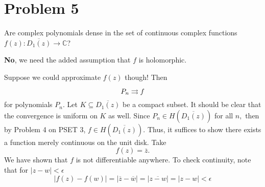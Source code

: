 \documentclass[11pt]{article}
\newcommand{\bbC}{\mathbb{C}}
\begin{document}
\section*{Problem 5}
\begin{problem}
    Are complex polynomials dense in the set of continuous complex functions $f(z): \overline{D_1(z)} \to \bbC$?
\end{problem}
\begin{solution}
\textbf{No}, we need the added assumption that $f$ is holomorphic. 

Suppose we could approximate $f(z)$ though! Then 
\[P_n\overset{}{\rightrightarrows} f\] for polynomials $P_n.$ Let $K \subseteq \overline{D_1(z)}$ be a compact subset. It should be clear that the convergence is uniform on $K$ as well. Since $P_n \in H(\overline{D_1(z)})$ for all $n,$ then by Problem 4 on PSET 3, $f \in H(\overline{D_1(z)}).$ Thus, it suffices to show there exists a function merely continuous on the unit disk. Take 
\[f(z) = \overline{z}.\] We have shown that $f$ is not differentiable anywhere. To check continuity, note that for $|z-w|< \epsilon$
\[|f(z) - f(w)| = |\overline{z} - \overline{w}| = |\overline{z - w}| = |z - w|< \epsilon\]
\end{solution}
\end{document}
